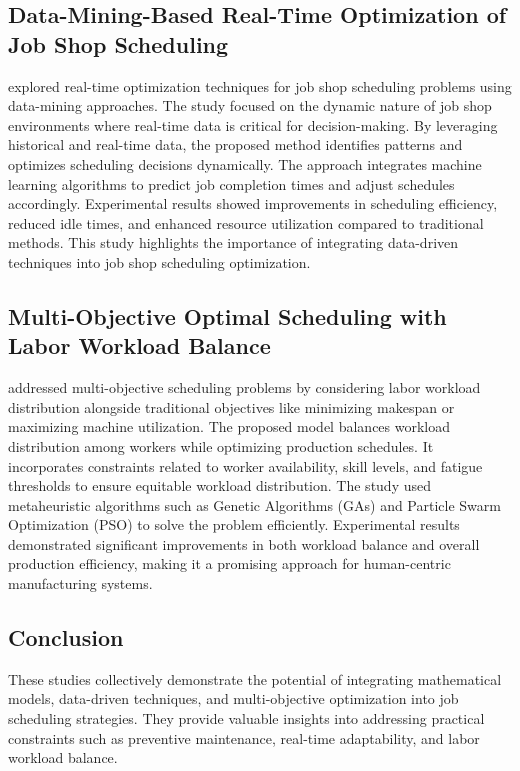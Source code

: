 \subsection{Data-Mining-Based Real-Time Optimization of Job Shop Scheduling}
\cite{datamining2022} explored real-time optimization techniques for job shop scheduling problems using data-mining approaches. The study focused on the dynamic nature of job shop environments where real-time data is critical for decision-making. By leveraging historical and real-time data, the proposed method identifies patterns and optimizes scheduling decisions dynamically. The approach integrates machine learning algorithms to predict job completion times and adjust schedules accordingly. Experimental results showed improvements in scheduling efficiency, reduced idle times, and enhanced resource utilization compared to traditional methods. This study highlights the importance of integrating data-driven techniques into job shop scheduling optimization.

\subsection{Multi-Objective Optimal Scheduling with Labor Workload Balance}
\cite{multiobjective2021} addressed multi-objective scheduling problems by considering labor workload distribution alongside traditional objectives like minimizing makespan or maximizing machine utilization. The proposed model balances workload distribution among workers while optimizing production schedules. It incorporates constraints related to worker availability, skill levels, and fatigue thresholds to ensure equitable workload distribution. The study used metaheuristic algorithms such as Genetic Algorithms (GAs) and Particle Swarm Optimization (PSO) to solve the problem efficiently. Experimental results demonstrated significant improvements in both workload balance and overall production efficiency, making it a promising approach for human-centric manufacturing systems.

\subsection{Conclusion}
These studies collectively demonstrate the potential of integrating mathematical models, data-driven techniques, and multi-objective optimization into job scheduling strategies. They provide valuable insights into addressing practical constraints such as preventive maintenance, real-time adaptability, and labor workload balance.
